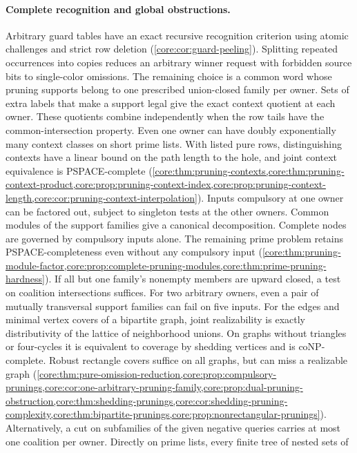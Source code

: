 \paragraph{Complete recognition and global obstructions.}
Arbitrary guard tables have an exact recursive recognition criterion using
atomic challenges and strict row deletion
(\cref{core:cor:guard-peeling}). Splitting repeated occurrences into
copies reduces an arbitrary winner request with forbidden source bits
to single-color omissions. The remaining choice is a common word whose
pruning supports belong to one prescribed union-closed family per owner.
Sets of extra labels that make a support legal give the exact
context quotient at each owner. These quotients combine independently
when the row tails have the common-intersection property. Even one
owner can have doubly exponentially many context classes on short
prime lists. With listed pure rows, distinguishing contexts have
a linear bound on the path length to the hole, and joint context
equivalence is PSPACE-complete
(\cref{core:thm:pruning-contexts,core:thm:pruning-context-product,core:prop:pruning-context-index,core:prop:pruning-context-length,core:cor:pruning-context-interpolation}).
Inputs compulsory at one owner can be factored out, subject to
singleton tests at the other owners.
Common modules of the support families give a canonical decomposition.
Complete nodes are governed by compulsory inputs alone. The remaining
prime problem retains PSPACE-completeness even without any compulsory
input (\cref{core:thm:pruning-module-factor,core:prop:complete-pruning-modules,core:thm:prime-pruning-hardness}).
If all but one family's nonempty members are upward closed, a test on
coalition intersections suffices. For two arbitrary owners, even a pair
of mutually transversal support families can fail on five inputs.
For the edges and minimal vertex covers of a bipartite graph, joint
realizability is exactly distributivity of the lattice of neighborhood
unions. On graphs without triangles or four-cycles it is equivalent to
coverage by shedding vertices and is coNP-complete. Robust rectangle
covers suffice on all graphs, but can miss a realizable graph
(\cref{core:thm:pure-omission-reduction,core:prop:compulsory-prunings,core:cor:one-arbitrary-pruning-family,core:prop:dual-pruning-obstruction,core:thm:shedding-prunings,core:cor:shedding-pruning-complexity,core:thm:bipartite-prunings,core:prop:nonrectangular-prunings}).
Alternatively, a cut on subfamilies of
the given negative queries carries at most one coalition per owner.
Directly on prime lists, every finite tree of nested sets of
